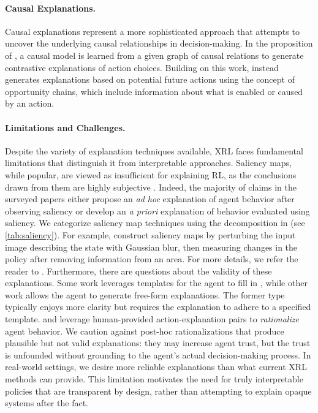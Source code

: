 \paragraph{Causal Explanations.}
Causal explanations represent a more sophisticated approach that attempts to uncover the underlying causal relationships in decision-making. In the proposition of \cite{madumal_explainable_2020}, a causal model is learned from a given graph of causal relations to generate contrastive explanations of action choices. Building on this work, \cite{madumal_distal_2020} instead generates explanations based on potential future actions using the concept of opportunity chains, which include information about what is enabled or caused by an action.

\paragraph{Limitations and Challenges.}
Despite the variety of explanation techniques available, XRL faces fundamental limitations that distinguish it from interpretable approaches. Saliency maps, while popular, are viewed as insufficient for explaining RL, as the conclusions drawn from them are highly subjective \cite{atrey2019exploratory}. Indeed, the majority of claims in the surveyed papers either propose an \textit{ad hoc} explanation of agent behavior after observing saliency or develop an \textit{a priori} explanation of behavior evaluated using saliency.
We categorize saliency map techniques using the decomposition in \cite{atrey2019exploratory} (see \ref{tab:saliency}). For example, \cite{greydanus2018visualizing} construct saliency maps by perturbing the input image describing the state with Gaussian blur, then measuring changes in the policy after removing information from an area. For more details, we refer the reader to \cite{atrey2019exploratory}.
Furthermore, there are questions about the validity of these explanations. Some work leverages templates for the agent to fill in \cite{ImpRoboticController}, while other work allows the agent to generate free-form explanations. The former type typically enjoys more clarity but requires the explanation to adhere to a specified template. \cite{frogger} and \cite{wang2019verbalexplanations} leverage human-provided action-explanation pairs to \textit{rationalize} agent behavior. We caution against post-hoc rationalizations that produce plausible but not valid explanations: they may increase agent trust, but the trust is unfounded without grounding to the agent's actual decision-making process.
In real-world settings, we desire more reliable explanations than what current XRL methods can provide. This limitation motivates the need for truly interpretable policies that are transparent by design, rather than attempting to explain opaque systems after the fact.

